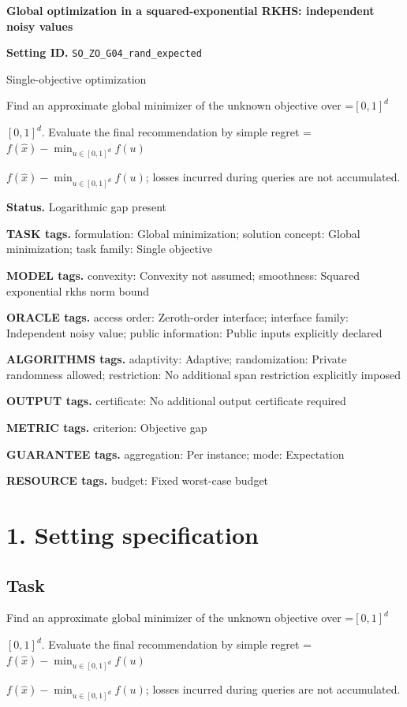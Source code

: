 \documentclass[10pt,a4paper]{article}
\newcommand{\AtlasMath}[1]{\par\begingroup\centering\setbox0=\hbox{$\displaystyle #1$}\ifdim\wd0>1.4\linewidth\typeout{ATLAS WIDE FORMULA: \the\wd0}\fi\ifdim\wd0>\linewidth\resizebox{\linewidth}{!}{\box0}\else\box0\fi\par\endgroup}
\newcommand{\AtlasInlineMath}[1]{\begingroup\setbox0=\hbox{$#1$}\ifdim\wd0>.4\linewidth\endgroup\AtlasMath{#1}\else\endgroup$#1$\fi}
\begin{document}
\raggedright

{\LARGE\bfseries\sffamily\color{AtlasNavy} Global optimization in a squared-exponential RKHS: independent noisy values\par}\vspace{5pt}
\textbf{Setting ID.} \texttt{SO\_\allowbreak{}ZO\_\allowbreak{}G04\_\allowbreak{}rand\_\allowbreak{}expected}

Single-objective optimization

Find an approximate global minimizer of the unknown objective over \AtlasInlineMath{[0,1]^d}. Evaluate the final recommendation by simple regret \AtlasInlineMath{f(\widehat{x})-\min_{u\in [0,1]^d}f(u)}; losses incurred during queries are not accumulated.

\textbf{Status.} Logarithmic gap present

\textbf{TASK tags.} formulation: Global minimization; solution concept: Global minimization; task family: Single objective

\textbf{MODEL tags.} convexity: Convexity not assumed; smoothness: Squared exponential rkhs norm bound

\textbf{ORACLE tags.} access order: Zeroth-order interface; interface family: Independent noisy value; public information: Public inputs explicitly declared

\textbf{ALGORITHMS tags.} adaptivity: Adaptive; randomization: Private randomness allowed; restriction: No additional span restriction explicitly imposed

\textbf{OUTPUT tags.} certificate: No additional output certificate required

\textbf{METRIC tags.} criterion: Objective gap

\textbf{GUARANTEE tags.} aggregation: Per instance; mode: Expectation

\textbf{RESOURCE tags.} budget: Fixed worst-case budget

\section{1. Setting specification}
\subsection{Task}
Find an approximate global minimizer of the unknown objective over \AtlasInlineMath{[0,1]^d}. Evaluate the final recommendation by simple regret \AtlasInlineMath{f(\widehat{x})-\min_{u\in [0,1]^d}f(u)}; losses incurred during queries are not accumulated.
\end{document}
